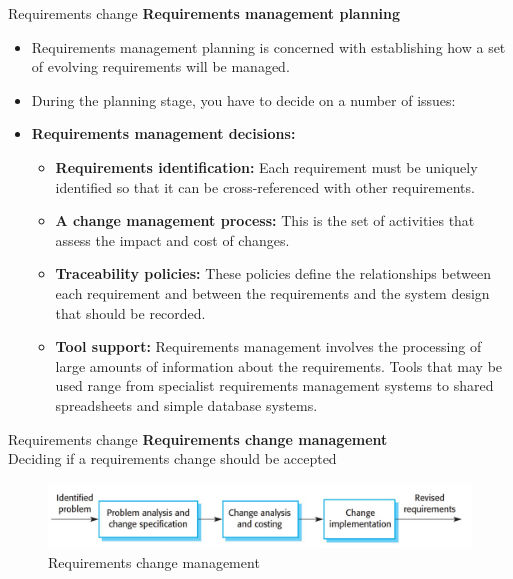 \documentclass{beamer}
\begin{document}
\begin{frame}{Requirements change}
	\textbf{ Requirements management planning}
\begin{itemize}
	\item Requirements management planning is concerned with establishing how a set of evolving requirements will be managed. 
	\item During the planning stage, you have to 
	decide on a number of issues:
	\item \textbf{Requirements management decisions:}
	\begin{itemize}
		\item \textbf{Requirements identification:} Each requirement must be uniquely identified so that it can 
		be cross-referenced with other requirements. 
		\item \textbf{A change management process:} This is the set of activities that assess the impact and 
		cost of changes.
		\item \textbf{Traceability policies:} These policies define the relationships between each requirement 
		and between the requirements and the system design that should be recorded. 
		\item \textbf{Tool support:}  Requirements management involves the processing of large 
		amounts of information about the requirements. Tools that may be used range 
		from specialist requirements management systems to shared spreadsheets and 
		simple database systems.

	\end{itemize}
\end{itemize}
\end{frame}
\begin{frame}{Requirements change}
	\textbf{Requirements change management}\\
	Deciding if a requirements change should be accepted
\begin{figure}
	\includegraphics[scale=.34]{img/m2_9.jpg}
	\caption{Requirements change management}
\end{figure}
\end{frame}
\end{document}
